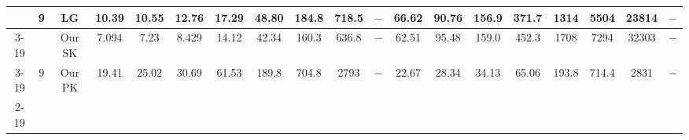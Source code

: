 \begin{table}[]
{\begin{tabular}{|c|c|c|cccccccccccccccc|}
& \multirow{3}{*}{9} & LG & \multicolumn{1}{c|}{10.39} & \multicolumn{1}{c|}{10.55} & \multicolumn{1}{c|}{12.76} & \multicolumn{1}{c|}{17.29} & \multicolumn{1}{c|}{48.80} & \multicolumn{1}{c|}{184.8} & \multicolumn{1}{c|}{718.5} & \multicolumn{1}{c|}{$-$} & \multicolumn{1}{c|}{66.62} & \multicolumn{1}{c|}{90.76} & \multicolumn{1}{c|}{156.9} & \multicolumn{1}{c|}{371.7} & \multicolumn{1}{c|}{1314} & \multicolumn{1}{c|}{5504} & \multicolumn{1}{c|}{23814} & $-$ \\ \cline{3-19} 
 &  & Our SK & \multicolumn{1}{c|}{\cellcolor{blue!30}7.094} & \multicolumn{1}{c|}{\cellcolor{blue!30}7.23} & \multicolumn{1}{c|}{\cellcolor{blue!30}8.429} & \multicolumn{1}{c|}{\cellcolor{blue!30}14.12} & \multicolumn{1}{c|}{\cellcolor{blue!30}42.34} & \multicolumn{1}{c|}{\cellcolor{blue!30}160.3} & \multicolumn{1}{c|}{\cellcolor{blue!30}636.8} & \multicolumn{1}{c|}{$-$} & \multicolumn{1}{c|}{62.51} & \multicolumn{1}{c|}{95.48} & \multicolumn{1}{c|}{159.0} & \multicolumn{1}{c|}{452.3} & \multicolumn{1}{c|}{1708} & \multicolumn{1}{c|}{7294} & \multicolumn{1}{c|}{32303} & $-$ \\ \cline{3-19} 
 & \multirow{-3}{*}{9} & Our PK & \multicolumn{1}{c|}{19.41} & \multicolumn{1}{c|}{25.02} & \multicolumn{1}{c|}{30.69} & \multicolumn{1}{c|}{61.53} & \multicolumn{1}{c|}{189.8} & \multicolumn{1}{c|}{704.8} & \multicolumn{1}{c|}{2793} & \multicolumn{1}{c|}{$-$} & \multicolumn{1}{c|}{\cellcolor{blue!30}22.67} & \multicolumn{1}{c|}{\cellcolor{blue!30}28.34} & \multicolumn{1}{c|}{\cellcolor{blue!30}34.13} & \multicolumn{1}{c|}{\cellcolor{blue!30}65.06} & \multicolumn{1}{c|}{\cellcolor{blue!30}193.8} & \multicolumn{1}{c|}{\cellcolor{blue!30}714.4} & \multicolumn{1}{c|}{\cellcolor{blue!30}2831} & $-$ \\ \cline{2-19} 


\end{tabular}}
\end{table}

